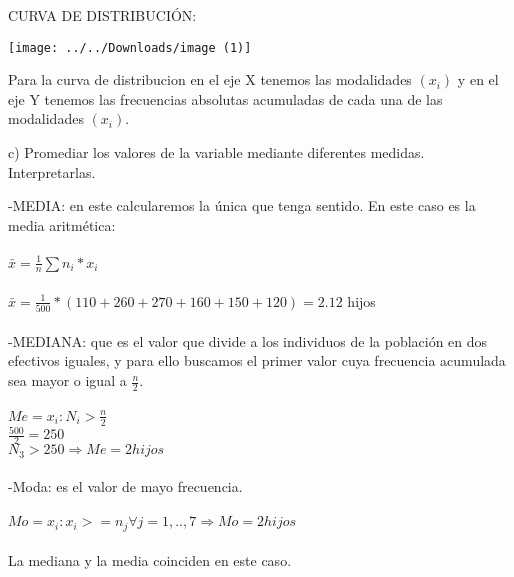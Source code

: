 \documentclass{article}
\begin{document}
\begin{center}

CURVA DE DISTRIBUCIÓN:
\begin{center}
	\texttt{[image: ../../Downloads/image (1)]}
\end{center}
Para la curva de distribucion en el eje X tenemos las modalidades $(x_{i})$ y en el eje Y tenemos las frecuencias absolutas acumuladas de cada una de las modalidades $(x_{i})$. 
\end{center}
	 \begin{flushleft}
c) Promediar los valores de la variable mediante diferentes medidas. Interpretarlas.
\end{flushleft}
-MEDIA: en este calcularemos la única que tenga sentido. En este caso es la media aritmética: 
\\
\\
$\bar{x} = \frac{1}{n}  \sum   n_{i} * x_{i}$ 
\\
\\
$\bar{x} = \frac{1}{500} * (110 + 260 +270 + 160 + 150 + 120) = 2.12 $ hijos
\\
\\
-MEDIANA: que es el valor que divide a los individuos de la población en dos efectivos iguales, y para ello buscamos el primer valor cuya frecuencia acumulada sea mayor o igual a $\frac{n}{2}$.
\\
\\
$Me = x_{i} : N_{i} > \frac{n}{2}$
\\

$\frac{500}{2} = 250$ 
\\

$N_{3} > 250  \Rightarrow Me = 2 hijos  $
\\
\\
-Moda: es el valor de mayo frecuencia.
\\
\\
$Mo = x_{i} :x_{i} >= n_{j} \forall j=1,..,7  \Rightarrow Mo = 2 hijos$
\\
\\
\textrightarrow La mediana y la media coinciden en este caso.
\\
\\
\end{document}
